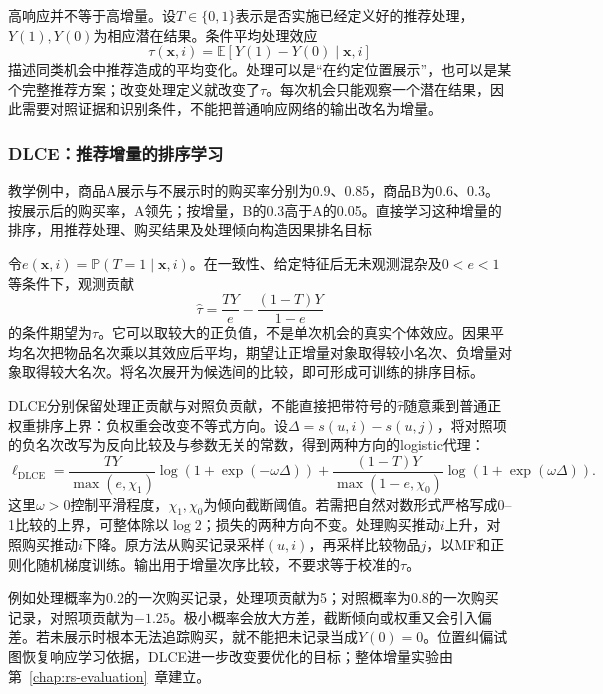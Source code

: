 高响应并不等于高增量。设$T\in\{0,1\}$表示是否实施已经定义好的推荐处理，$Y(1),Y(0)$为相应潜在结果。条件平均处理效应
\begin{equation}
 \tau(\bm x,i)=\mathbb E[Y(1)-Y(0)\mid\bm x,i]
 \label{eq:rs-uplift}
\end{equation}
描述同类机会中推荐造成的平均变化。处理可以是“在约定位置展示”，也可以是某个完整推荐方案；改变处理定义就改变了$\tau$。每次机会只能观察一个潜在结果，因此需要对照证据和识别条件，不能把普通响应网络的输出改名为增量。

\subsubsection{DLCE：推荐增量的排序学习}
\label{sec:rs-dlce}

教学例中，商品A展示与不展示时的购买率分别为0.9、0.85，商品B为0.6、0.3。按展示后的购买率，A领先；按增量，B的0.3高于A的0.05。直接学习这种增量的排序，用推荐处理、购买结果及处理倾向构造因果排名目标

令$e(\bm x,i)=\mathbb P(T=1\mid\bm x,i)$。在一致性、给定特征后无未观测混杂及$0<e<1$等条件下，观测贡献
\begin{equation}
 \widehat\tau=\frac{TY}{e}-\frac{(1-T)Y}{1-e}
 \label{eq:rs-uplift-ips}
\end{equation}
的条件期望为$\tau$。它可以取较大的正负值，不是单次机会的真实个体效应。因果平均名次把物品名次乘以其效应后平均，期望让正增量对象取得较小名次、负增量对象取得较大名次。将名次展开为候选间的比较，即可形成可训练的排序目标。

DLCE分别保留处理正贡献与对照负贡献，不能直接把带符号的$\widehat\tau$随意乘到普通正权重排序上界：负权重会改变不等式方向。设$\Delta=s(u,i)-s(u,j)$，将对照项的负名次改写为反向比较及与参数无关的常数，得到两种方向的logistic代理：
\begin{equation}
 \ell_{\mathrm{DLCE}}=
 \frac{TY}{\max(e,\chi_1)}\log(1+\exp(-\omega\Delta))
 +\frac{(1-T)Y}{\max(1-e,\chi_0)}
       \log(1+\exp(\omega\Delta)).
 \label{eq:rs-dlce-loss}
\end{equation}
这里$\omega>0$控制平滑程度，$\chi_1,\chi_0$为倾向截断阈值。若需把自然对数形式严格写成0--1比较的上界，可整体除以$\log2$；损失的两种方向不变。处理购买推动$i$上升，对照购买推动$i$下降。原方法从购买记录采样$(u,i)$，再采样比较物品$j$，以MF和正则化随机梯度训练。输出用于增量次序比较，不要求等于校准的$\tau$。

例如处理概率为0.2的一次购买记录，处理项贡献为5；对照概率为0.8的一次购买记录，对照项贡献为$-1.25$。极小概率会放大方差，截断倾向或权重又会引入偏差。若未展示时根本无法追踪购买，就不能把未记录当成$Y(0)=0$。位置纠偏试图恢复响应学习依据，DLCE进一步改变要优化的目标；整体增量实验由第~\ref{chap:rs-evaluation}~章建立。

